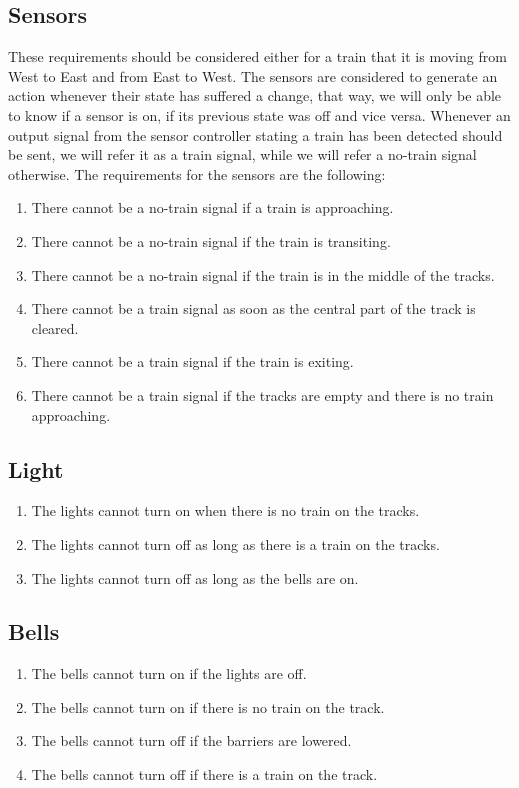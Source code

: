 \documentclass[final]{report}
\begin{document}
\subsection{Sensors}
These requirements should be considered either for a train that it is moving from West to East and from East to West.
The sensors are considered to generate an action whenever their state has suffered a change, that way, we will only be able to know if a sensor is on, if its previous state was off and vice versa.
Whenever an output signal from the sensor controller stating a train has been detected should be sent, we will refer it as a train signal, while we will refer a no-train signal otherwise.
The requirements for the sensors are the following:
	\begin{enumerate}
		\item There cannot be a no-train signal if a train is approaching.
		\item There cannot be a no-train signal if the train is transiting.
		\item There cannot be a no-train signal if the train is in the middle of the tracks.
		\item There cannot be a train signal as soon as the central part of the track is cleared.
		\item There cannot be a train signal if the train is exiting.
		\item There cannot be a train signal if the tracks are empty and there is no train approaching.
	\end{enumerate}

\subsection{Light}
	\begin{enumerate}
		\item The lights cannot turn on when there is no train on the tracks.
		\item The lights cannot turn off as long as there is a train on the tracks.
		\item The lights cannot turn off as long as the bells are on.
	\end{enumerate}

\subsection{Bells}
	\begin{enumerate}
		\item The bells cannot turn on if the lights are off.
		\item The bells cannot turn on if there is no train on the track.
		\item The bells cannot turn off if the barriers are lowered.
		\item The bells cannot turn off if there is a train on the track.
	\end{enumerate}
\end{document}
